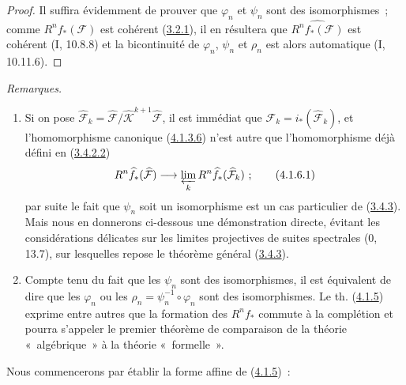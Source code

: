 \begin{proof}
Il suffira évidemment de prouver que $\varphi_n$ et $\psi_n$ sont des
isomorphismes~; comme $R^nf_*(\mathcal F)$ est cohérent
(\hyperref[III.3.2.1-fr]{3.2.1}), il en résultera que
$\widehat{R^nf_*(\mathcal F)}$ est cohérent (I, 10.8.8) et la bicontinuité
de $\varphi_n$, $\psi_n$ et $\rho_n$ est alors automatique (I, 10.11.6).
\end{proof}

\begin{env}[4.1.6]
\label{III.4.1.6-fr}
\emph{Remarques.}
\begin{enumerate}
\item[(i)] Si on pose
$\widehat{\mathcal F}_k=
\widehat{\mathcal F}/\widehat{\mathcal K}^{k+1}
\widehat{\mathcal F}$, il est immédiat que
$\mathcal F_k=i_*(\widehat{\mathcal F}_k)$, et l'homomorphisme canonique
(\hyperref[III.4.1.3.6-fr]{4.1.3.6}) n'est autre que l'homomorphisme déjà
défini en (\hyperref[III.3.4.2.2-fr]{3.4.2.2})
\[
R^n\widehat f_*(\widehat{\mathcal F})
\longrightarrow\varprojlim_kR^n\widehat f_*(\widehat{\mathcal F}_k)~;
\tag{4.1.6.1}\label{III.4.1.6.1-fr}
\]
par suite le fait que $\psi_n$ soit un isomorphisme est un cas particulier
de (\hyperref[III.3.4.3-fr]{3.4.3}). Mais nous en donnerons ci-dessous une
démonstration directe, évitant les considérations délicates sur les limites
projectives de suites spectrales (0, 13.7), sur lesquelles repose le
théorème général (\hyperref[III.3.4.3-fr]{3.4.3}).

\item[(ii)] Compte tenu du fait que les $\psi_n$ sont des isomorphismes, il
est équivalent de dire que les $\varphi_n$ ou les
$\rho_n=\psi_n^{-1}\circ\varphi_n$ sont des isomorphismes. Le th.
(\hyperref[III.4.1.5-fr]{4.1.5}) exprime entre autres que la formation des
$R^nf_*$ commute à la complétion et pourra s'appeler le premier théorème de
comparaison de la théorie «~algébrique~» à la théorie «~formelle~».
\end{enumerate}
Nous commencerons par établir la forme affine de
(\hyperref[III.4.1.5-fr]{4.1.5})~:
\end{env}

